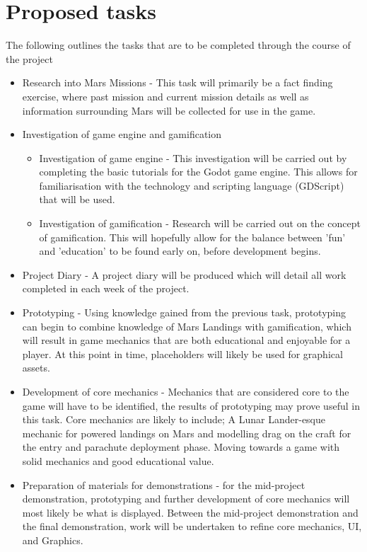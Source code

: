 \documentclass[11pt,fleqn,twoside]{article}
\begin{document}
\section{Proposed tasks}
The following outlines the tasks that are to be completed through the course of the project
\begin{itemize}
  \item Research into Mars Missions - This task will primarily be a fact finding exercise, where past mission and current mission details as well as information surrounding Mars will be collected for use in the game. 
  
  \item Investigation of game engine and gamification
    \begin{itemize}
        \item Investigation of game engine - This investigation will be carried out by completing the basic tutorials for the Godot game engine. This allows for familiarisation with the technology and scripting language (GDScript) that will be used.
        
        \item Investigation of gamification - Research will be carried out on the concept of gamification. This will hopefully allow for the balance between 'fun' and 'education' to be found early on, before development begins.
    \end{itemize}
  \item Project Diary - A project diary will be produced which will detail all work completed in each week of the project.
             
  \item Prototyping - Using knowledge gained from the previous task, prototyping can begin to combine knowledge of Mars Landings with gamification, which will result in game mechanics that are both educational and enjoyable for a player. At this point in time, placeholders will likely be used for graphical assets.
  
  \item Development of core mechanics - Mechanics that are considered core to the game will have to be identified, the results of prototyping may prove useful in this task. Core mechanics are likely to include; A Lunar Lander-esque mechanic for powered landings on Mars and modelling drag on the craft for the entry and parachute deployment phase.  Moving towards a game with solid mechanics and good educational value.
  
  \item Preparation of materials for demonstrations - for the mid-project demonstration, prototyping and further development of core mechanics will most likely be what is displayed. Between the mid-project demonstration and the final demonstration, work will be undertaken to refine core mechanics, UI, and Graphics. 
\end{itemize}
\end{document}
